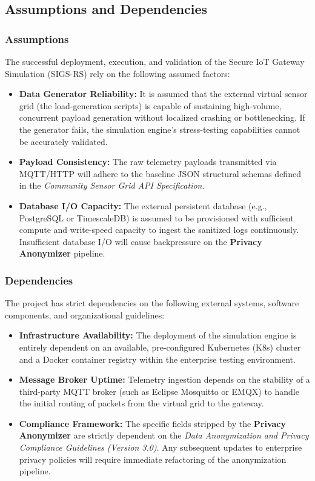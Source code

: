 \documentclass[12pt,letterpaper]{article}
\begin{document}
\subsection{Assumptions and Dependencies}
\subsubsection{Assumptions}
The successful deployment, execution, and validation of the Secure IoT Gateway Simulation (SIGS-RS) rely on the following assumed factors:
\begin{itemize}
\item \textbf{Data Generator Reliability:} It is assumed that the external virtual sensor grid (the load-generation scripts) is capable of sustaining high-volume, concurrent payload generation without localized crashing or bottlenecking. If the generator fails, the simulation engine's stress-testing capabilities cannot be accurately validated.
\item \textbf{Payload Consistency:} The raw telemetry payloads transmitted via MQTT/HTTP will adhere to the baseline JSON structural schemas defined in the \emph{Community Sensor Grid API Specification}.
\item \textbf{Database I/O Capacity:} The external persistent database (e.g., PostgreSQL or TimescaleDB) is assumed to be provisioned with sufficient compute and write-speed capacity to ingest the sanitized logs continuously. Insufficient database I/O will cause backpressure on the \textbf{Privacy Anonymizer} pipeline.
\end{itemize}

\subsubsection{Dependencies}
The project has strict dependencies on the following external systems, software components, and organizational guidelines:
\begin{itemize}
\item \textbf{Infrastructure Availability:} The deployment of the simulation engine is entirely dependent on an available, pre-configured Kubernetes (K8s) cluster and a Docker container registry within the enterprise testing environment.
\item \textbf{Message Broker Uptime:} Telemetry ingestion depends on the stability of a third-party MQTT broker (such as Eclipse Mosquitto or EMQX) to handle the initial routing of packets from the virtual grid to the gateway.
\item \textbf{Compliance Framework:} The specific fields stripped by the \textbf{Privacy Anonymizer} are strictly dependent on the \emph{Data Anonymization and Privacy Compliance Guidelines (Version 3.0)}. Any subsequent updates to enterprise privacy policies will require immediate refactoring of the anonymization pipeline.
\end{itemize}
\end{document}
